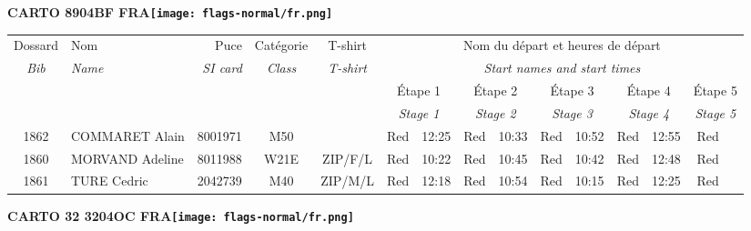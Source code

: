 \documentclass{report}
\begin{document}
  \Huge \centering \bfseries CARTO 8904BF FRA\normalfont \footnotesize \sffamily \hfill \texttt{[image: flags-normal/fr.png]} \newline 
  \begin{longtable}{|c|l|r|c|c|*{5}{cc|}}
    Dossard & Nom  & Puce    & Catégorie & T-shirt & \multicolumn{10}{c|}{Nom du départ et heures de départ} \\
    \itshape Bib     & \itshape Name & \itshape SI card & \itshape Class  & \itshape  T-shirt  & \multicolumn{10}{c|}{\itshape Start names and start times} \\
    \hline
    & & & & & \multicolumn{2}{c|}{Étape 1} & \multicolumn{2}{c|}{Étape 2} & \multicolumn{2}{c|}{Étape 3} & \multicolumn{2}{c|}{Étape 4} & \multicolumn{2}{c|}{Étape 5} \\
    & & & & & \multicolumn{2}{c|}{\itshape Stage 1} & \multicolumn{2}{c|}{\itshape Stage 2} & \multicolumn{2}{c|}{\itshape Stage 3} & \multicolumn{2}{c|}{\itshape Stage 4} & \multicolumn{2}{c|}{\itshape Stage 5} \\
    \hline
    1862 & COMMARET Alain & 8001971 & M50 &   & Red & 12:25 & Red & 10:33 & Red & 10:52 & Red & 12:55 & Red &  \\
    1860 & MORVAND Adeline & 8011988 & W21E & ZIP/F/L & Red & 10:22 & Red & 10:45 & Red & 10:42 & Red & 12:48 & Red &  \\
    1861 & TURE Cedric & 2042739 & M40 & ZIP/M/L & Red & 12:18 & Red & 10:54 & Red & 10:15 & Red & 12:25 & Red &  \\
  \end{longtable}
\newpage
  \Huge \centering \bfseries CARTO 32 3204OC FRA\normalfont \footnotesize \sffamily \hfill \texttt{[image: flags-normal/fr.png]} \newline 
\end{document}
